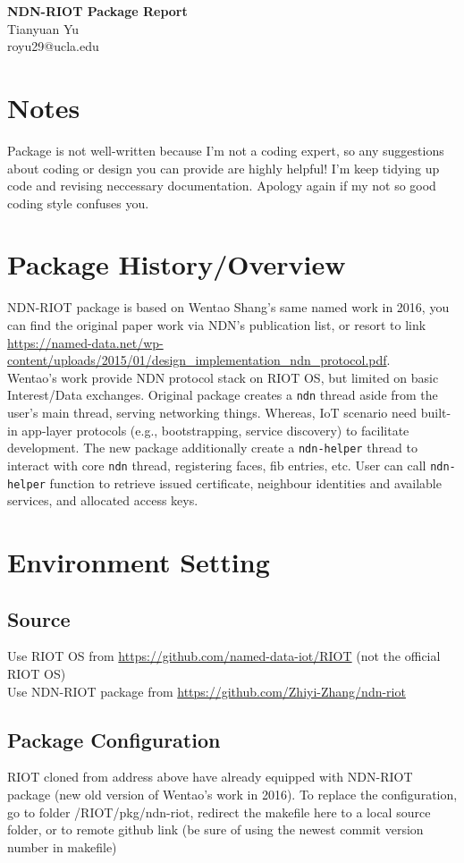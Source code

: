 \documentclass[a4paper, 11pt]{article}
\begin{document}
    \noindent
    \large\textbf{NDN-RIOT Package Report} \\ 
    \normalsize Tianyuan Yu \\ royu29@ucla.edu
    
    \section{Notes}
    Package is not well-written because I'm not a coding expert, so any suggestions about coding or design you can provide are highly helpful! I'm keep tidying up code and revising neccessary documentation. Apology again if my not so good coding style confuses you.
    
    \section{Package History/Overview}
    NDN-RIOT package is based on Wentao Shang's same named work in 2016, you can find the original paper work via NDN's publication list, or resort to link \url{https://named-data.net/wp-content/uploads/2015/01/design_implementation_ndn_protocol.pdf}.\\ Wentao's work provide NDN protocol stack on RIOT OS, but limited on basic Interest/Data exchanges. Original package creates a \texttt{ndn} thread aside from the user's main thread, serving networking things. Whereas, IoT scenario need built-in app-layer protocols (e.g., bootstrapping, service discovery) to facilitate development. The new package additionally create a \texttt{ndn-helper} thread to interact with core \texttt{ndn} thread, registering faces, fib entries, etc. User can call \texttt{ndn-helper} function to retrieve issued certificate, neighbour identities and available services, and allocated access keys.
    
    \section{Environment Setting}
    \subsection{Source}
    Use RIOT OS from \url{https://github.com/named-data-iot/RIOT} (not the official RIOT OS)\\
    Use NDN-RIOT package from \url{https://github.com/Zhiyi-Zhang/ndn-riot}
    \subsection{Package Configuration}
    RIOT cloned from address above have already equipped with NDN-RIOT package (new old version of Wentao's work in 2016). To replace the configuration, go to folder /RIOT/pkg/ndn-riot, redirect the makefile here to a local source folder, or to remote github link (be sure of using the newest commit version number in makefile) 
\end{document}
